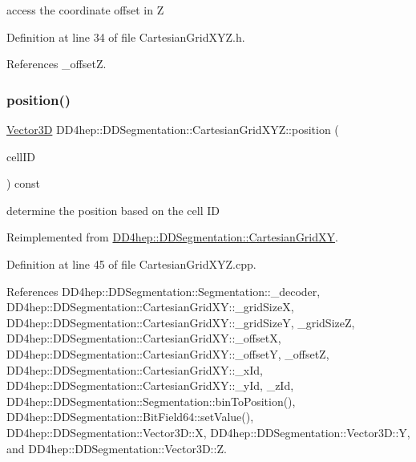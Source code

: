 access the coordinate offset in Z 



Definition at line 34 of file Cartesian\+Grid\+X\+Y\+Z.\+h.



References \+\_\+offsetZ.

\hypertarget{class_d_d4hep_1_1_d_d_segmentation_1_1_cartesian_grid_x_y_z_ad8d64eb704f1d54553fb9ed24f4bbde4}{}\label{class_d_d4hep_1_1_d_d_segmentation_1_1_cartesian_grid_x_y_z_ad8d64eb704f1d54553fb9ed24f4bbde4} 
\subsubsection{\texorpdfstring{position()}{position()}}
{\footnotesize\ttfamily \hyperlink{struct_d_d4hep_1_1_d_d_segmentation_1_1_vector3_d}{Vector3D} D\+D4hep\+::\+D\+D\+Segmentation\+::\+Cartesian\+Grid\+X\+Y\+Z\+::position (\begin{DoxyParamCaption}\item[{const \hyperlink{namespace_d_d4hep_1_1_d_d_segmentation_ac7af071d85cb48820914434a07e21ba1}{Cell\+ID} \&}]{cell\+ID }\end{DoxyParamCaption}) const\hspace{0.3cm}{\ttfamily [virtual]}}



determine the position based on the cell ID 



Reimplemented from \hyperlink{class_d_d4hep_1_1_d_d_segmentation_1_1_cartesian_grid_x_y_a699a4abe55b46d29e5a0d43fcb76b81c}{D\+D4hep\+::\+D\+D\+Segmentation\+::\+Cartesian\+Grid\+XY}.



Definition at line 45 of file Cartesian\+Grid\+X\+Y\+Z.\+cpp.



References D\+D4hep\+::\+D\+D\+Segmentation\+::\+Segmentation\+::\+\_\+decoder, D\+D4hep\+::\+D\+D\+Segmentation\+::\+Cartesian\+Grid\+X\+Y\+::\+\_\+grid\+SizeX, D\+D4hep\+::\+D\+D\+Segmentation\+::\+Cartesian\+Grid\+X\+Y\+::\+\_\+grid\+SizeY, \+\_\+grid\+SizeZ, D\+D4hep\+::\+D\+D\+Segmentation\+::\+Cartesian\+Grid\+X\+Y\+::\+\_\+offsetX, D\+D4hep\+::\+D\+D\+Segmentation\+::\+Cartesian\+Grid\+X\+Y\+::\+\_\+offsetY, \+\_\+offsetZ, D\+D4hep\+::\+D\+D\+Segmentation\+::\+Cartesian\+Grid\+X\+Y\+::\+\_\+x\+Id, D\+D4hep\+::\+D\+D\+Segmentation\+::\+Cartesian\+Grid\+X\+Y\+::\+\_\+y\+Id, \+\_\+z\+Id, D\+D4hep\+::\+D\+D\+Segmentation\+::\+Segmentation\+::bin\+To\+Position(), D\+D4hep\+::\+D\+D\+Segmentation\+::\+Bit\+Field64\+::set\+Value(), D\+D4hep\+::\+D\+D\+Segmentation\+::\+Vector3\+D\+::X, D\+D4hep\+::\+D\+D\+Segmentation\+::\+Vector3\+D\+::Y, and D\+D4hep\+::\+D\+D\+Segmentation\+::\+Vector3\+D\+::Z.

